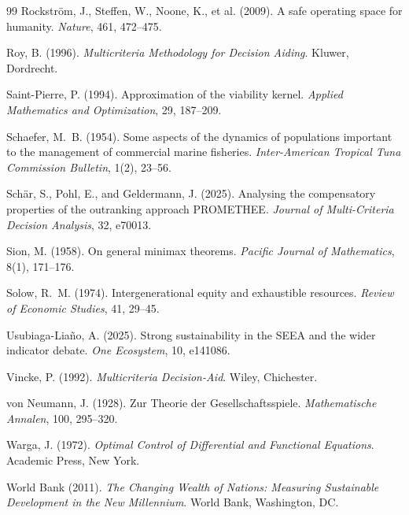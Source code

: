 \documentclass[preprint,11pt,authoryear]{elsarticle}
\theoremstyle{definition}
\theoremstyle{remark}
\begin{document}
\begin{thebibliography}{99}
 Rockstr\"om, J., Steffen, W., Noone, K., et al. (2009). A safe operating space for humanity. \emph{Nature}, 461, 472--475.

 Roy, B. (1996). \emph{Multicriteria Methodology for Decision Aiding}. Kluwer, Dordrecht.

 Saint-Pierre, P. (1994). Approximation of the viability kernel. \emph{Applied Mathematics and Optimization}, 29, 187--209.

 Schaefer, M.~B. (1954). Some aspects of the dynamics of populations important to the management of commercial marine fisheries. \emph{Inter-American Tropical Tuna Commission Bulletin}, 1(2), 23--56.

 Sch\"ar, S., Pohl, E., and Geldermann, J. (2025). Analysing the compensatory properties of the outranking approach PROMETHEE. \emph{Journal of Multi-Criteria Decision Analysis}, 32, e70013.

 Sion, M. (1958). On general minimax theorems. \emph{Pacific Journal of Mathematics}, 8(1), 171--176.

 Solow, R.~M. (1974). Intergenerational equity and exhaustible resources. \emph{Review of Economic Studies}, 41, 29--45.

 Usubiaga-Lia\~no, A. (2025). Strong sustainability in the SEEA and the wider indicator debate. \emph{One Ecosystem}, 10, e141086.

 Vincke, P. (1992). \emph{Multicriteria Decision-Aid}. Wiley, Chichester.

 von Neumann, J. (1928). Zur Theorie der Gesellschaftsspiele. \emph{Mathematische Annalen}, 100, 295--320.

 Warga, J. (1972). \emph{Optimal Control of Differential and Functional Equations}. Academic Press, New York.

 World Bank (2011). \emph{The Changing Wealth of Nations: Measuring Sustainable Development in the New Millennium}. World Bank, Washington, DC.

\end{thebibliography}
\end{document}
